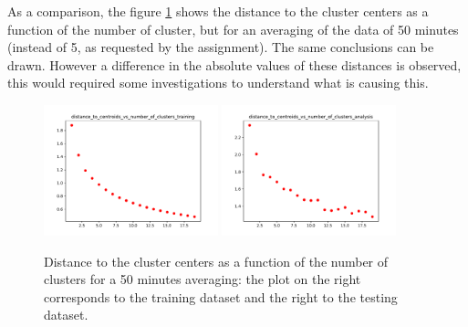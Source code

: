 \documentclass[11pt]{amsart}
\begin{document}
As a comparison, the figure \ref{fig:distance_to_centroids3} shows the distance to the cluster centers as a function of the number of cluster, but for an averaging of the data of 50 minutes (instead of 5, as requested by the assignment).
The same conclusions can be drawn.
However a difference in the absolute values of these distances is observed, this would required some investigations to understand what is causing this.
\begin{figure}
    \includegraphics[width=0.45\textwidth]{../plots/distance_to_centroids_vs_number_of_clusters_training.pdf}
    \includegraphics[width=0.45\textwidth]{../plots/distance_to_centroids_vs_number_of_clusters_analysis.pdf}
    \caption{\label{fig:distance_to_centroids3} Distance to the cluster centers as a function of the number of clusters for a 50 minutes averaging: the plot on the right corresponds to the training dataset and the right to the testing dataset.}
\end{figure}
\end{document}
